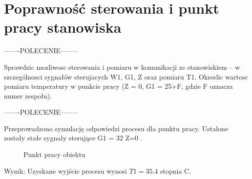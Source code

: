 \section{Poprawność sterowania i punkt pracy stanowiska}
\label{lab:zad1}


-------POLECENIE--------

Sprawdzic mozliwosc sterowania i pomiaru w komunikacji ze stanowiskiem – w szczególnosci
sygnałów sterujacych W1, G1, Z oraz pomiaru T1. Okreslic wartosc pomiaru
temperatury w punkcie pracy (Z = 0, G1 = 25+F, gdzie F oznacza numer zespołu).

-------POLECENIE--------

Przeprowadzono symulację odpowiedzi procesu dla punktu pracy. 
Ustalone zostały stałe sygnały sterujące G1 = 32 Z=0 .

\begin{figure}[H] 
    \centering
    
    \caption{Punkt pracy obiektu}
    \label{lab:zad1:figure}
\end{figure}

Wynik: 
Uzyskane wyjście procesu wynosi $T1=35.4$ stopnia C.


